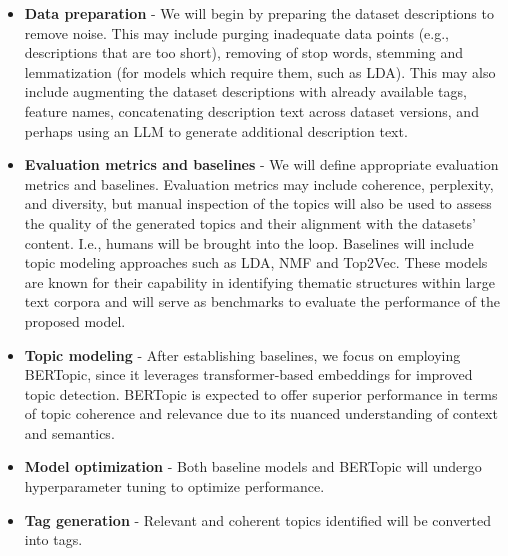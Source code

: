 \documentclass{article}
\begin{document}
\begin{itemize}
    \item \textbf{Data preparation} - We will begin by preparing the dataset descriptions to remove noise. This may include purging inadequate data points (e.g., descriptions that are too short), removing of stop words, stemming and lemmatization (for models which require them, such as LDA). This may also include augmenting the dataset descriptions with already available tags, feature names, concatenating description text across dataset versions, and perhaps using an LLM to generate additional description text.

    \item \textbf{Evaluation metrics and baselines} - We will define appropriate evaluation metrics and baselines. Evaluation metrics may include coherence, perplexity, and diversity, but manual inspection of the topics will also be used to assess the quality of the generated topics and their alignment with the datasets' content. I.e., humans will be brought into the loop. Baselines will include topic modeling approaches such as LDA, NMF and Top2Vec. These models are known for their capability in identifying thematic structures within large text corpora and will serve as benchmarks to evaluate the performance of the proposed model.

    \item \textbf{Topic modeling} - After establishing baselines, we focus on employing BERTopic, since it leverages transformer-based embeddings for improved topic detection. BERTopic is expected to offer superior performance in terms of topic coherence and relevance due to its nuanced understanding of context and semantics.

    \item \textbf{Model optimization} - Both baseline models and BERTopic will undergo hyperparameter tuning to optimize performance.

    \item \textbf{Tag generation} - Relevant and coherent topics identified will be converted into tags.
\end{itemize}
\end{document}
